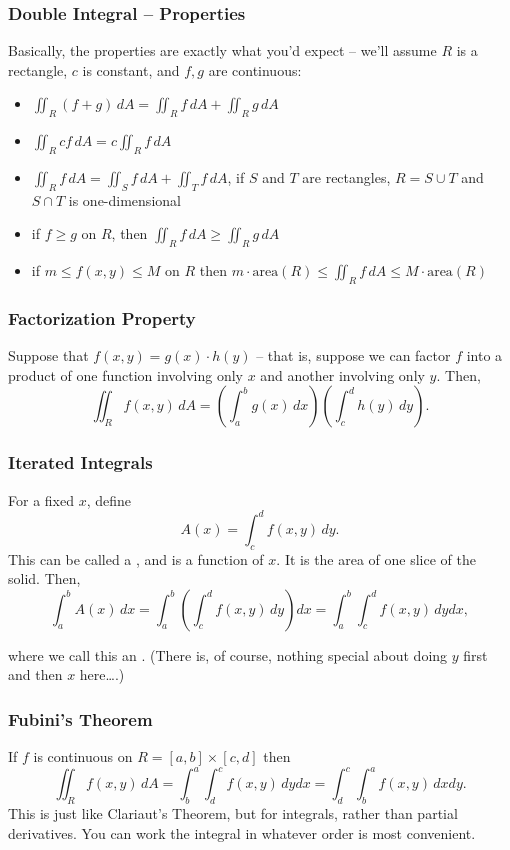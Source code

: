 \subsubsection{Double Integral – Properties}
Basically, the properties are exactly what you’d expect – we’ll assume \(R\) is a rectangle, \(c\) is constant, and \(f, g\) are continuous:
\begin{itemize}
  \item \(\iint_R (f + g) \, dA = \iint_R f \, dA + \iint_R g \, dA\)
  \item \(\iint_R cf \, dA = c \iint_R f \, dA\)
  \item \(\iint_R f \, dA = \iint_S f \, dA + \iint_T f \, dA\), if \(S\) and \(T\) are rectangles, \(R = S \cup T\) and \(S \cap T\) is one-dimensional
  \item if \(f \geq g\) on \(R\), then \(\iint_R f \, dA \geq \iint_R g \, dA\)
  \item if \(m \leq f(x, y) \leq M\) on \(R\) then \(m \cdot \text{area}(R) \leq \iint_R f \, dA \leq M \cdot \text{area}(R)\)
\end{itemize}
\subsubsection{Factorization Property}
Suppose that \(f(x, y) = g(x) \cdot h(y)\) – that is, suppose we can factor \(f\) into a product of one function involving only \(x\) and another involving only \(y\). Then,
\[
  \iint_R f(x, y) \, dA = \left( \int_a^b g(x) \, dx \right) \left( \int_c^d h(y) \, dy \right).
\]
\subsubsection{Iterated Integrals}
For a fixed \(x\), define
\[
  A(x) = \int_c^d f(x, y) \, dy.
\]
This can be called a , and is a function of \(x\). It is the area of one slice of the solid. Then,
\[
  \int_a^b A(x) \, dx = \int_a^b \left( \int_c^d f(x, y) \, dy \right) dx = \int_a^b \int_c^d f(x, y) \, dy dx,
\]

where we call this an . (There is, of course, nothing special about doing \(y\) first and then \(x\) here\ldots.)

\subsubsection{Fubini’s Theorem}

If \(f\) is continuous on \(R = [a, b] \times [c, d]\) then
\[
  \iint_R f(x, y) \, dA = \int_b^a \int_d^c f(x, y) \, dy dx = \int_d^c \int_b^a f(x, y) \, dx dy.
\]
This is just like Clariaut’s Theorem, but for integrals, rather than partial derivatives. You can work the integral in whatever order is most convenient.

